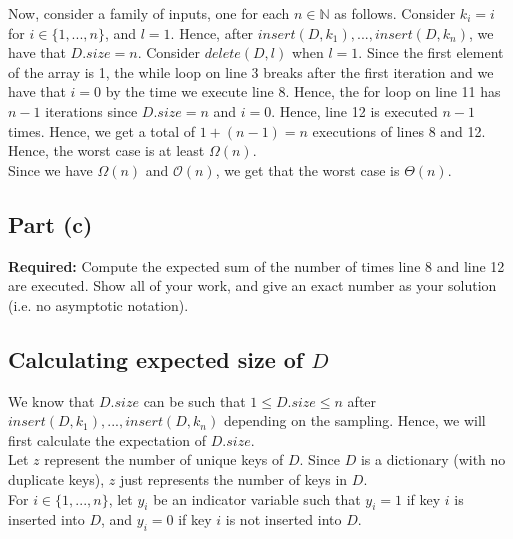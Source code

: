 \documentclass[12pt]{article}
\newcommand{\N}{\mathbb{N}}
\begin{document}
Now, consider a family of inputs, one for each $n \in \N$ as follows. Consider $k_i = i$ for $i \in \{1,...,n\}$, and $l = 1$. Hence, after $insert(D,k_1),...,insert(D,k_n)$, we have that $D.size = n$. Consider $delete(D,l)$ when $l = 1$. Since the first element of the array is 1, the while loop on line 3 breaks after the first iteration and we have that $i = 0$ by the time we execute line 8. Hence, the for loop on line 11 has $n-1$ iterations since $D.size = n$ and $i = 0$. Hence, line 12 is executed $n-1$ times.  Hence, we get a total of $1 + (n-1) = n$ executions of lines 8 and 12. Hence, the worst case is at least $\Omega(n)$. \\

Since we have $\Omega(n)$ and $\mathcal{O}(n)$, we get that the worst case is $\Theta(n)$. 

\newpage

\subsection*{Part (c)}

\textbf{Required:} Compute the expected sum of the number of times line 8 and line 12 are executed.
Show all of your work, and give an exact number as your solution (i.e. no asymptotic
notation). 

\subsection*{Calculating expected size of $D$}

We know that $D.size$ can be such that $1 \leq D.size \leq n$ after $insert(D,k_1),...,insert(D,k_n)$ depending on the sampling. Hence, we will first calculate the expectation of $D.size$. \\

Let $z$ represent the number of unique keys of $D$. Since $D$ is a dictionary (with no duplicate keys), $z$ just represents the number of keys in $D$. \\

For $i \in \{1,...,n\}$, let $y_i$ be an indicator variable such that $y_i = 1$ if key $i$ is inserted into $D$, and $y_i = 0$ if key $i$ is not inserted into $D$. \\
\end{document}
